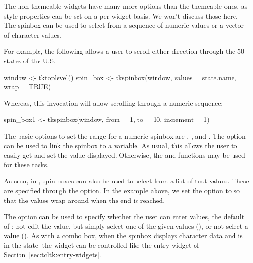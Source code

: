 The non-themeable widgets have many more options than the themeable
ones, as style properties can be set on a per-widget basis. We won't
discuss those here. The spinbox can be used to select from a sequence
of numeric values or a vector of character values.


For example, the following allows a user to scroll either direction through the 50
states of the U.S.

\begin{Schunk}
\begin{Sinput}
 window <- tktoplevel()
 spin_box <- tkspinbox(window, values = state.name, wrap = TRUE)
\end{Sinput}
\end{Schunk}

Whereas, this invocation will allow scrolling through a numeric sequence:
\begin{Schunk}
\begin{Sinput}
 spin_box1 <- tkspinbox(window, from = 1, to = 10, increment = 1)
\end{Sinput}
\end{Schunk}



The basic options to set the range for a numeric spinbox are
, , and
.  The 
option can be used to link the spinbox to a \TCL\/ variable. As usual,
this allows the user to easily get and set the value
displayed. Otherwise, the  and 
functions may be used for these tasks. 

As seen, in \TK, spin boxes can also be used to select from a list of
text values. These are specified through the
 option. In the  example
above, we set the  option to  so
that the values wrap around when the end is reached.
 
The option  can be used to specify whether
the user can enter values, the default of ; not edit the
value, but simply select one of the given values (),
or not select a value ().  As with a combo box, when
the \TK\/ spinbox displays character data and is in the 
state, the widget can be controlled like the entry widget of
Section~\ref{sec:tcltk:entry-widgets}.




